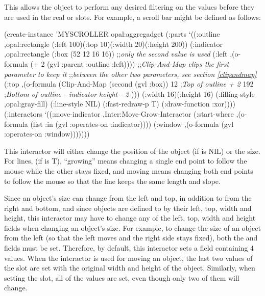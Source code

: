 This allows the object to perform any desired filtering on the values
before they are used in the real  or
 slots.  For example, a scroll bar might be defined as
follows:
\begin{programexample}
(create-instance 'MYSCROLLER opal:aggregadget
   (:parts
    `((:outline ,opal:rectangle
		(:left 100)(:top 10)(:width 20)(:height 200))
      (:indicator ,opal:rectangle
		  (:box (52 12 16 16)) ;;{\it only the second value is used}
		  (:left ,(o-formula (+ 2 (gvl :parent :outline :left))))
		  ;;{\it Clip-And-Map clips the first parameter to keep it}
		  ;;{\it  between the other two parameters, see section \ref{clipandmap}}
		  (:top ,(o-formula
			  (Clip-And-Map (second (gvl :box))
			    12  ;{\it Top of outline + 2}
			    192 ;{\it Bottom of outline - indicator height - 2}
			    )))
		  (:width 16)(:height 16)
		  (:filling-style ,opal:gray-fill)
		  (:line-style NIL)
		  (:fast-redraw-p T)
		  (:draw-function :xor))))
   (:interactors
    `((:move-indicator ,Inter:Move-Grow-Interactor
		       (:start-where
		        ,(o-formula (list :in (gvl :operates-on :indicator))))
		       (:window ,(o-formula (gvl :operates-on :window)))))))
\end{programexample}
		
This interactor will either change the position of the object (if
 is NIL) or the size.  For lines, (if  is T),
``growing'' means changing a single end point to follow the mouse while the
other stays fixed, and moving means changing both end points to follow the
mouse so that the line keeps the same length and slope.

Since an object's size can change from the left and
top, in addition to from the right and bottom, and since objects are
defined to by their left, top, width and height, this interactor may have
to change any of the left, top, width and height fields when changing an
object's size.  For example, to
change the size of an object from the left (so that the left moves and the
right side stays fixed), both the  and  fields must be
set.  Therefore, by default, this interactor sets a  field
containing 4 values.  When the interactor is used for moving an object, the
last two values of the  slot are set with the original width and
height of the object.  Similarly, when setting the  slot, all
of the values are set, even though only two of them will change.

